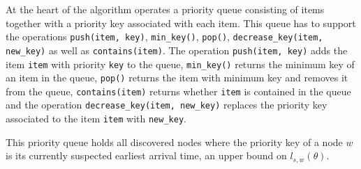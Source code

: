 At the heart of the algorithm operates a priority queue consisting of items together with a priority key associated with each item.
This queue has to support the operations \texttt{push(item, key)}, \texttt{min\_key()}, \texttt{pop()}, \texttt{decrease\_key(item, new\_key)} as well as \texttt{contains(item)}.
The operation \texttt{push(item, key)} adds the item \texttt{item} with priority \texttt{key} to the queue, \texttt{min\_key()} returns the minimum key of an item in the queue, \texttt{pop()} returns the item with minimum key and removes it from the queue, \texttt{contains(item)} returns whether \texttt{item} is contained in the queue and the operation \texttt{decrease\_key(item, new\_key)} replaces the priority key associated to the item \texttt{item} with \texttt{new\_key}.


This priority queue holds all discovered nodes where the priority key of a node $w$ is its currently suspected earliest arrival time, an upper bound on $l_{s,w}(\theta)$.


